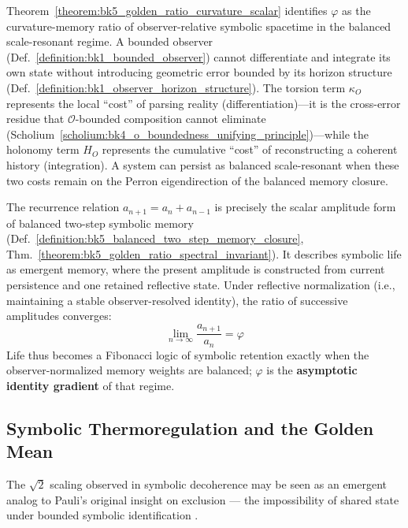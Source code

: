 \begin{scholium}
\label{scholium:bk5_constant_of_becoming}
Theorem~\ref{theorem:bk5_golden_ratio_curvature_scalar} identifies $\varphi$ as the curvature-memory ratio of observer-relative symbolic spacetime in the balanced scale-resonant regime. A bounded observer (Def.~\ref{definition:bk1_bounded_observer}) cannot differentiate and integrate its own state without introducing geometric error bounded by its horizon structure (Def.~\ref{definition:bk1_observer_horizon_structure}). The torsion term $\kappa_O$ represents the local ``cost'' of parsing reality (differentiation)---it is the cross-error residue that $\mathcal{O}$-bounded composition cannot eliminate (Scholium~\ref{scholium:bk4_o_boundedness_unifying_principle})---while the holonomy term $H_O$ represents the cumulative ``cost'' of reconstructing a coherent history (integration). A system can persist as balanced scale-resonant when these two costs remain on the Perron eigendirection of the balanced memory closure.
\end{scholium}

\begin{remark}
\label{remark:bk5_symbolic_fibonacci_coding}
The recurrence relation $a_{n+1}=a_n+a_{n-1}$ is precisely the scalar amplitude
form of balanced two-step symbolic memory
(Def.~\ref{definition:bk5_balanced_two_step_memory_closure},
Thm.~\ref{theorem:bk5_golden_ratio_spectral_invariant}).  It describes symbolic
life as emergent memory, where the present amplitude is constructed from current
persistence and one retained reflective state.  Under reflective normalization
(i.e., maintaining a stable observer-resolved identity), the ratio of successive
amplitudes converges:
\[
\lim_{n \to \infty} \frac{a_{n+1}}{a_n} = \varphi
\]
Life thus becomes a Fibonacci logic of symbolic retention exactly when the
observer-normalized memory weights are balanced; $\varphi$ is the
\textbf{asymptotic identity gradient} of that regime.
\end{remark}

\subsection{Symbolic Thermoregulation and the Golden Mean}
\label{subsec:bk5_thermoregulation_and_phi}

The $\sqrt{2}$ scaling observed in symbolic decoherence may be seen as an emergent analog to Pauli’s original insight on exclusion — the impossibility of shared state under bounded symbolic identification \cite{pauli1925exclusion}.

